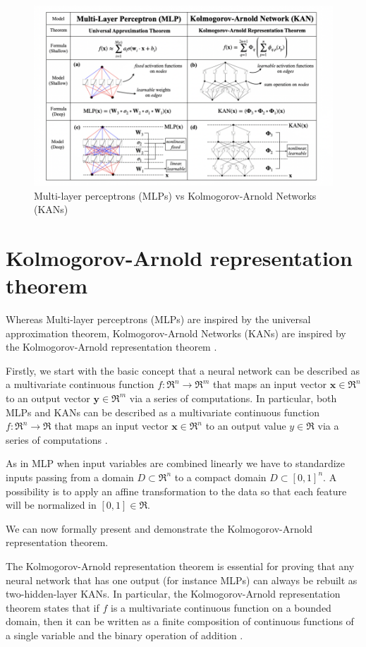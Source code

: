 \documentclass[12pt,a4paper]{article}
\begin{document}
\begin{figure}[H]
    \centering
    \includegraphics[width=0.8\linewidth]{Images/MLP-KAN.png}
    \caption{Multi-layer perceptrons (MLPs) vs Kolmogorov-Arnold Networks (KANs)}
    \label{fig:MLPKAN}
\end{figure}

\section{Kolmogorov-Arnold representation theorem}
\label{sec:ka}
Whereas Multi-layer perceptrons (MLPs) are inspired by the universal approximation theorem, Kolmogorov-Arnold Networks (KANs) are inspired by the Kolmogorov-Arnold representation theorem \cite{KAN}.

Firstly, we start with the basic concept that a neural network can be described as a multivariate continuous function $f: \Re^n \rightarrow \Re^m $ that maps an input vector $\textbf{x}\in \Re^n$ to an output vector $\textbf{y}\in \Re^m$ via a series of computations. In particular, both MLPs and KANs can be described as a multivariate continuous function $f: \Re^n \rightarrow \Re $ that maps an input vector $\textbf{x}\in \Re^n$ to an output value $y\in \Re$ via a series of computations \cite{book1NAML, book2NAML}.

As in MLP when input variables are combined linearly we have to standardize inputs passing from a domain $D \subset \Re^n$ to a compact domain $D \subset [0,1]^n $. A possibility is to apply an affine transformation to the data so that each feature will be normalized in $[0,1] \in 
 \Re$.

We can now formally present and demonstrate the Kolmogorov-Arnold representation theorem. 

The Kolmogorov-Arnold representation theorem is essential for proving that any neural network that has one output (for instance MLPs) can always be rebuilt as two-hidden-layer KANs. In particular, the Kolmogorov-Arnold representation theorem states that if $f$ is a multivariate continuous function on a bounded domain, then it can be written as a finite composition of continuous functions of a single variable and the binary operation of addition \cite{KAtheorem, KArevisited}.
\end{document}
